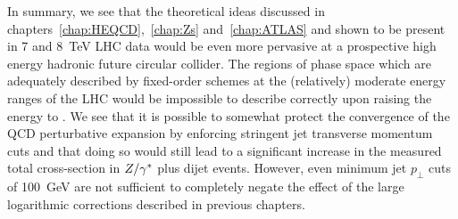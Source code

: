 	In summary, we see that the theoretical ideas discussed in chapters~\ref{chap:HEQCD},~\ref{chap:Zs} and~\ref{chap:ATLAS}
	and shown to be present in 7 and 8~TeV LHC data would be even more pervasive at a prospective high energy hadronic
	future circular collider.  The regions of phase space which are adequately described by fixed-order schemes at
	the (relatively) moderate energy ranges of the LHC would be impossible to describe correctly upon raising the energy
	to \htev.  We see that it is possible to somewhat protect the convergence of the QCD perturbative expansion by enforcing
	stringent jet transverse momentum cuts and that doing so would still lead to a significant increase in the measured
	total cross-section in $Z/\gamma^*$ plus dijet events.  However, even minimum jet $p_\perp$ cuts of 100~GeV are not sufficient
	to completely negate the effect of the large logarithmic corrections described in previous chapters.

